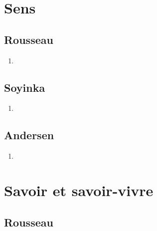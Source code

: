 \documentclass[a4paper, 11pt, hidelinks]{article}
\begin{document}
\section{Sens}



\subsection{Rousseau}


\begin{enumerate}
    \item 
\end{enumerate}



\subsection{Soyinka}


\begin{enumerate}
    \item 
\end{enumerate}




\subsection{Andersen}


\begin{enumerate}
    \item 
\end{enumerate}
































\section{Savoir et savoir-vivre}



\subsection{Rousseau}
\end{document}
